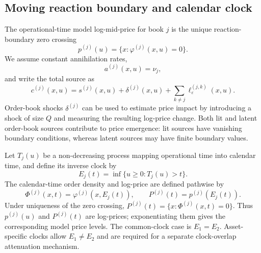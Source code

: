 \documentclass[5p,final]{elsarticle}
\begin{document}
\subsection{Moving reaction boundary and calendar clock}

The operational-time model log-mid-price for book $j$ is the unique reaction-boundary zero crossing
\begin{equation}
    p^{(j)}(u)=\{x:\varphi^{(j)}(x,u)=0\}.
    \label{eq:operational-price}
\end{equation}
We assume constant annihilation rates,
\begin{equation}
    a^{(j)}(x,u)=\nu_j,
\end{equation}
and write the total source as
\begin{equation}
    c^{(j)}(x,u)=s^{(j)}(x,u)+\delta^{(j)}(x,u)
    +\sum_{k\ne j}\ell_\varepsilon^{(j,k)}(x,u).
\end{equation}
Order-book shocks $\delta^{(j)}$ can be used to estimate price impact \citep{DianaGebbie2025} by introducing a shock of size $Q$ and measuring the resulting log-price change. Both lit and latent order-book sources contribute to price emergence: lit sources have vanishing boundary conditions, whereas latent sources may have finite boundary values.

Let $T_j(u)$ be a non-decreasing process mapping operational time into calendar time, and define its inverse clock by
\begin{equation}
    E_j(t)=\inf\{u\geq0:T_j(u)>t\}.
    \label{eq:inverse-clock}
\end{equation}
The calendar-time order density and log-price are defined pathwise by
\begin{equation}
    \Phi^{(j)}(x,t)=\varphi^{(j)}\!\left(x,E_j(t)\right),
    \qquad
    P^{(j)}(t)=p^{(j)}\!\left(E_j(t)\right).
    \label{eq:field-price-subordination}
\end{equation}
Under uniqueness of the zero crossing, $P^{(j)}(t)=\{x:\Phi^{(j)}(x,t)=0\}$. Thus $p^{(j)}(u)$ and $P^{(j)}(t)$ are log-prices; exponentiating them gives the corresponding model price levels. The common-clock case is $E_1=E_2$. Asset-specific clocks allow $E_1\ne E_2$ and are required for a separate clock-overlap attenuation mechanism.


\end{document}
